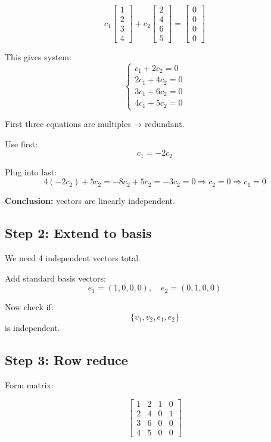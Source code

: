 \documentclass[11pt]{article}
\begin{document}
\[
c_1
\begin{bmatrix}
1\\2\\3\\4
\end{bmatrix}
+
c_2
\begin{bmatrix}
2\\4\\6\\5
\end{bmatrix}
=
\begin{bmatrix}
0\\0\\0\\0
\end{bmatrix}
\]

This gives system:
\[
\begin{cases}
c_1 + 2c_2 = 0 \\
2c_1 + 4c_2 = 0 \\
3c_1 + 6c_2 = 0 \\
4c_1 + 5c_2 = 0
\end{cases}
\]

First three equations are multiples → redundant.

Use first:
\[
c_1 = -2c_2
\]

Plug into last:
\[
4(-2c_2) + 5c_2 = -8c_2 + 5c_2 = -3c_2 = 0
\Rightarrow c_2 = 0
\Rightarrow c_1 = 0
\]

\textbf{Conclusion:} vectors are linearly independent.

\subsection*{Step 2: Extend to basis}

We need 4 independent vectors total.

Add standard basis vectors:
\[
e_1 = (1,0,0,0),\quad e_2 = (0,1,0,0)
\]

Now check if:
\[
\{v_1, v_2, e_1, e_2\}
\]
is independent.

\subsection*{Step 3: Row reduce}

Form matrix:

\[
\begin{bmatrix}
1 & 2 & 1 & 0 \\
2 & 4 & 0 & 1 \\
3 & 6 & 0 & 0 \\
4 & 5 & 0 & 0
\end{bmatrix}
\]
\end{document}
